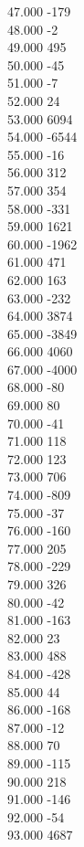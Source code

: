{ 47.000	-179 \\
 48.000	-2 \\
 49.000	495 \\
 50.000	-45 \\
 51.000	-7 \\
 52.000	24 \\
 53.000	6094 \\
 54.000	-6544 \\
 55.000	-16 \\
 56.000	312 \\
 57.000	354 \\
 58.000	-331 \\
 59.000	1621 \\
 60.000	-1962 \\
 61.000	471 \\
 62.000	163 \\
 63.000	-232 \\
 64.000	3874 \\
 65.000	-3849 \\
 66.000	4060 \\
 67.000	-4000 \\
 68.000	-80 \\
 69.000	80 \\
 70.000	-41 \\
 71.000	118 \\
 72.000	123 \\
 73.000	706 \\
 74.000	-809 \\
 75.000	-37 \\
 76.000	-160 \\
 77.000	205 \\
 78.000	-229 \\
 79.000	326 \\
 80.000	-42 \\
 81.000	-163 \\
 82.000	23 \\
 83.000	488 \\
 84.000	-428 \\
 85.000	44 \\
 86.000	-168 \\
 87.000	-12 \\
 88.000	70 \\
 89.000	-115 \\
 90.000	218 \\
 91.000	-146 \\
 92.000	-54 \\
 93.000	4687 \\
}
